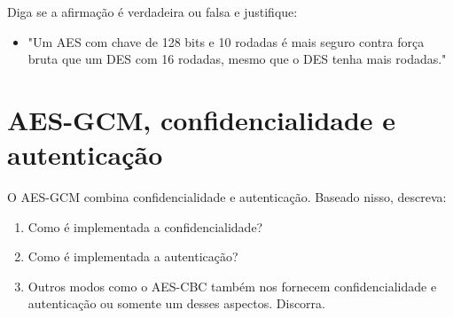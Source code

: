 Diga se a afirmação é verdadeira ou falsa e justifique:
\begin{itemize}
    \item "Um AES com chave de 128 bits e 10 rodadas é mais seguro contra força bruta que um DES com 16 rodadas, mesmo que o DES tenha mais rodadas."
\end{itemize}

\section{AES-GCM, confidencialidade e autenticação}
O AES-GCM combina confidencialidade e autenticação. Baseado nisso, descreva:
\begin{enumerate}
    \item Como é implementada a confidencialidade?
    \item  Como é implementada a autenticação?
    \item  Outros modos como o AES-CBC também nos fornecem confidencialidade e autenticação ou somente um desses aspectos. Discorra.
\end{enumerate}




